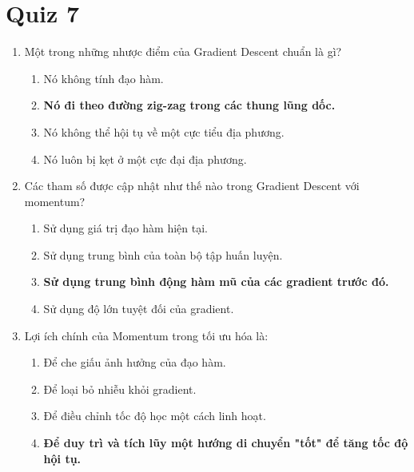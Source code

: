 \documentclass{book}
\begin{document}
\section{Quiz 7}
\begin{enumerate}
    \item Một trong những nhược điểm của Gradient Descent chuẩn là gì?
    \begin{multicols}{2}
        \begin{enumerate}[label=\Alph*]
            \item Nó không tính đạo hàm.
            \item \textbf{Nó đi theo đường zig-zag trong các thung lũng dốc.}
            \item Nó không thể hội tụ về một cực tiểu địa phương.
            \item Nó luôn bị kẹt ở một cực đại địa phương.
        \end{enumerate}
    \end{multicols}

    \item Các tham số được cập nhật như thế nào trong Gradient Descent với momentum?
    \begin{multicols}{2}
        \begin{enumerate}[label=\Alph*]
            \item Sử dụng giá trị đạo hàm hiện tại.
            \item Sử dụng trung bình của toàn bộ tập huấn luyện.
            \item \textbf{Sử dụng trung bình động hàm mũ của các gradient trước đó.}
            \item Sử dụng độ lớn tuyệt đối của gradient.
        \end{enumerate}
    \end{multicols}

    \item Lợi ích chính của Momentum trong tối ưu hóa là:
    \begin{multicols}{2}
        \begin{enumerate}[label=\Alph*]
            \item Để che giấu ảnh hưởng của đạo hàm.
            \item Để loại bỏ nhiễu khỏi gradient.
            \item Để điều chỉnh tốc độ học một cách linh hoạt.
            \item \textbf{Để duy trì và tích lũy một hướng di chuyển "tốt" để tăng tốc độ hội tụ.}
        \end{enumerate}
    \end{multicols}


\end{enumerate}
\end{document}
